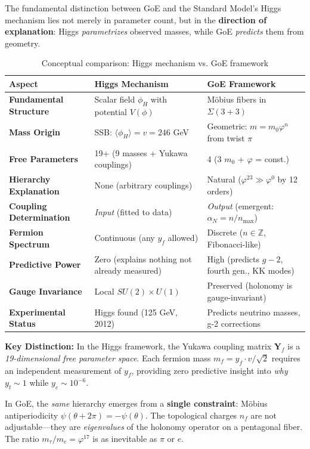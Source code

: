 \documentclass[12pt]{article}
\theoremstyle{definition}
\theoremstyle{plain}
\begin{document}
The fundamental distinction between GoE and the Standard Model's Higgs mechanism lies not merely in parameter count, but in the \textbf{direction of explanation}: Higgs \textit{parametrizes} observed masses, while GoE \textit{predicts} them from geometry.

\begin{table}[H]
\centering
\caption{Conceptual comparison: Higgs mechanism vs. GoE framework}
\small
\begin{tabular}{p{3.5cm}p{5cm}p{5cm}}
\toprule
\textbf{Aspect} & \textbf{Higgs Mechanism} & \textbf{GoE Framework} \\
\midrule
\textbf{Fundamental Structure} & Scalar field $\phi_H$ with potential $V(\phi)$ & M\"obius fibers in $\Sigma(3+3)$ \\
\textbf{Mass Origin} & SSB: $\langle\phi_H\rangle = v = 246$ GeV & Geometric: $m = m_0 \varphi^n$ from twist $\pi$ \\
\textbf{Free Parameters} & 19+ (9 masses + Yukawa couplings) & 4 (3 $m_0$ + $\varphi$ = const.) \\
\textbf{Hierarchy Explanation} & None (arbitrary couplings) & Natural ($\varphi^{23} \gg \varphi^0$ by 12 orders) \\
\textbf{Coupling Determination} & \textit{Input} (fitted to data) & \textit{Output} (emergent: $\alpha_N = n/n_{\max}$) \\
\textbf{Fermion Spectrum} & Continuous (any $y_f$ allowed) & Discrete ($n \in \mathbb{Z}$, Fibonacci-like) \\
\textbf{Predictive Power} & Zero (explains nothing not already measured) & High (predicts $g-2$, fourth gen., KK modes) \\
\textbf{Gauge Invariance} & Local $SU(2) \times U(1)$ & Preserved (holonomy is gauge-invariant) \\
\textbf{Experimental Status} & Higgs found (125 GeV, 2012) & Predicts neutrino masses, g-2 corrections \\
\bottomrule
\end{tabular}
\label{tab:higgs_vs_goe}
\end{table}

\textbf{Key Distinction:} In the Higgs framework, the Yukawa coupling matrix $\mathbf{Y}_f$ is a \textit{19-dimensional free parameter space}. Each fermion mass $m_f = y_f \cdot v / \sqrt{2}$ requires an independent measurement of $y_f$, providing zero predictive insight into \textit{why} $y_t \sim 1$ while $y_e \sim 10^{-6}$.

In GoE, the \textit{same} hierarchy emerges from a \textbf{single constraint}: M\"obius antiperiodicity $\psi(\theta+2\pi) = -\psi(\theta)$. The topological charges $n_f$ are not adjustable—they are \textit{eigenvalues} of the holonomy operator on a pentagonal fiber. The ratio $m_\tau/m_e = \varphi^{17}$ is as inevitable as $\pi$ or $e$.
\end{document}
